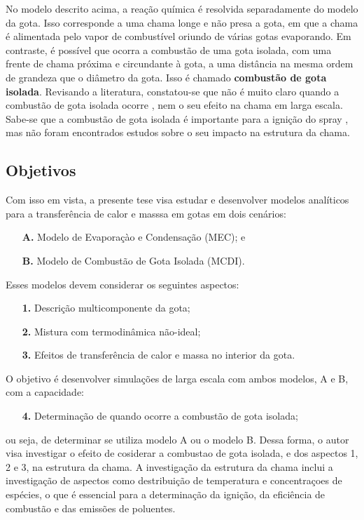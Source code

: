 No modelo descrito acima, a reação química é resolvida separadamente do modelo da gota. %
Isso corresponde a uma chama longe e não presa a gota, em que a chama é alimentada pelo vapor de combustível oriundo de várias gotas evaporando. 
Em contraste, é possível que ocorra a combustão de uma gota isolada, com uma frente de chama próxima e circundante à gota, a uma distância na mesma ordem de grandeza que o diâmetro da gota.
Isso é chamado \textbf{combustão de gota isolada}.
Revisando a literatura, constatou-se que não é muito claro quando a combustão de gota isolada ocorre \source{}, nem o seu efeito na chama em larga escala.
Sabe-se que a combustão de gota isolada é importante para a ignição do spray \cite{AggarwalS2014}, mas não foram encontrados estudos sobre o seu impacto na estrutura da chama.

\subsection{Objetivos} \label{sec:objetivos}

Com isso em vista, a presente tese visa estudar e desenvolver modelos analíticos para a transferência de calor e masssa em gotas em dois cenários: 
\begin{enumerate}
    \item[\textbf{A.}] Modelo de Evaporaçào e Condensação (MEC); e 
    \item[\textbf{B.}] Modelo de Combustão de Gota Isolada (MCDI).
\end{enumerate}
Esses modelos devem considerar os seguintes aspectos: 
\begin{enumerate}
    \item[\textbf{1.}] Descrição multicomponente da gota; 
    \item[\textbf{2.}] Mistura com termodinâmica não-ideal; 
    \item[\textbf{3.}] Efeitos de transferência	de calor e massa no interior da gota. 
\end{enumerate}
O objetivo é desenvolver simulações de larga escala com ambos modelos, {A} e {B}, com a capacidade:
\begin{enumerate}
    \item[\textbf{4.}] Determinação de quando ocorre a combustão de gota isolada;
\end{enumerate}
ou seja, de determinar se utiliza modelo {A} ou o modelo {B}.
Dessa forma, o autor visa investigar o efeito de cosiderar a combustao de gota isolada, e dos aspectos {1}, {2} e {3}, na estrutura da chama.
A investigação da estrutura da chama inclui a investigação de aspectos como destribuição de temperatura e concentraçoes de espécies, o que é essencial para a determinação da ignição, da eficiência de combustão e das emissões de poluentes.


